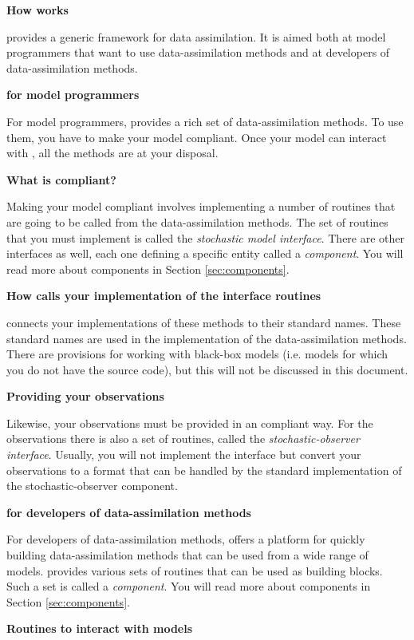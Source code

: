 \textbf{How \oda works}

\oda provides a generic framework for data assimilation. It is aimed both at model programmers that want to use data-assimilation methods and at developers of data-assimilation methods.

\textbf{\oda for model programmers}

For model programmers, \oda provides a rich set of data-assimilation methods. To use them, you have to make your model \oda compliant. Once your model can interact with \oda, all the \oda methods are at your disposal.

\textbf{What is \oda compliant?}

Making your model \oda compliant involves implementing a number of routines that are going to be called from the data-assimilation methods. The set of routines that you must implement is called the \emph{stochastic model interface}. There are other interfaces as well, each one defining a specific entity called a \emph{component}. You will read more about components in Section \ref{sec:components}.

\textbf{How \oda calls your implementation of the interface routines}

\oda connects your implementations of these methods to their standard names. These standard names are used in the implementation of the data-assimilation methods. There are provisions for working with black-box models (i.e. models for which you do not have the source code), but this will not be discussed in this document.

\textbf{Providing your observations}

Likewise, your observations must be provided in an \oda compliant way. For the observations there is also a set of routines, called the \emph{stochastic-observer interface}. Usually, you will not implement the interface but convert your observations to a format that can be handled by the standard \oda implementation of the stochastic-observer component.

\textbf{\oda for developers of data-assimilation methods}

For developers of data-assimilation methods, \oda offers a platform for quickly building data-assimilation methods that can be used from a wide range of models. \oda provides various sets of routines that can be used as building blocks. Such a set is called a \emph{component}. You will read more about components in Section \ref{sec:components}.

\textbf{Routines to interact with models}

